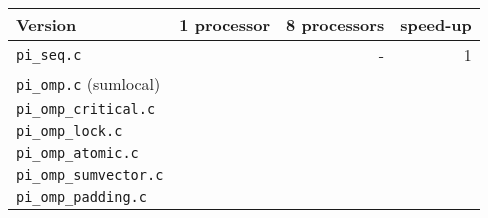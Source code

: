 \documentclass[a4paper]{article}
\begin{document}
\begin{table}[H]
	\centering
	\begin{tabular}{l|rrr}
		\textbf{Version} & \textbf{1 processor} & \textbf{8 processors} & \textbf{speed-up} \\
		\hline
		\verb|pi_seq.c| & & - & 1 \\
		\verb|pi_omp.c| (sumlocal) & & & \\
		\verb|pi_omp_critical.c| & & & \\
		\verb|pi_omp_lock.c| & & & \\
		\verb|pi_omp_atomic.c|  & & & \\
		\verb|pi_omp_sumvector.c| & & & \\
		\verb|pi_omp_padding.c| & & & \\
	\end{tabular}
\end{table}
\end{document}
